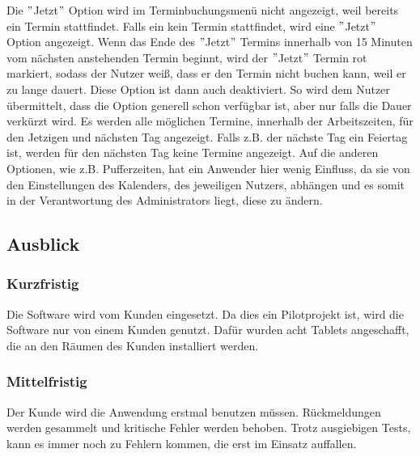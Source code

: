 Die \("\)Jetzt\("\) Option wird im Terminbuchungsmenü nicht angezeigt, weil bereits ein Termin stattfindet.
Falls ein kein Termin stattfindet, wird eine \("\)Jetzt\("\) Option angezeigt.
Wenn das Ende des \("\)Jetzt\("\) Termins innerhalb von 15 Minuten vom nächsten anstehenden Termin beginnt, wird der \("\)Jetzt\("\) Termin rot markiert, sodass der Nutzer weiß, dass er den Termin nicht buchen kann, weil er zu lange dauert.
Diese Option ist dann auch deaktiviert.
So wird dem Nutzer übermittelt, dass die Option generell schon verfügbar ist, aber nur falls die Dauer verkürzt wird.
Es werden alle möglichen Termine, innerhalb der Arbeitszeiten, für den Jetzigen und nächsten Tag angezeigt.
Falls z.B. der nächste Tag ein Feiertag ist, werden für den nächsten Tag keine Termine angezeigt.
Auf die anderen Optionen, wie z.B. Pufferzeiten, hat ein Anwender hier wenig Einfluss, da sie von den Einstellungen des Kalenders, des jeweiligen Nutzers, abhängen und es somit in der Verantwortung des Administrators liegt, diese zu ändern.
\newline
\newline

\subsection{Ausblick}\label{subsec:ausblick}
\subsubsection{Kurzfristig}\label{subsubsec:Kurzfristig}
Die Software wird vom Kunden eingesetzt.
Da dies ein Pilotprojekt ist, wird die Software nur von einem Kunden genutzt.
Dafür wurden acht Tablets angeschafft, die an den Räumen des Kunden installiert werden.

\subsubsection{Mittelfristig}\label{subsubsec:Mittelfristig}
Der Kunde wird die Anwendung erstmal benutzen müssen.
Rückmeldungen werden gesammelt und kritische Fehler werden behoben.
Trotz ausgiebigen Tests, kann es immer noch zu Fehlern kommen, die erst im Einsatz auffallen.
